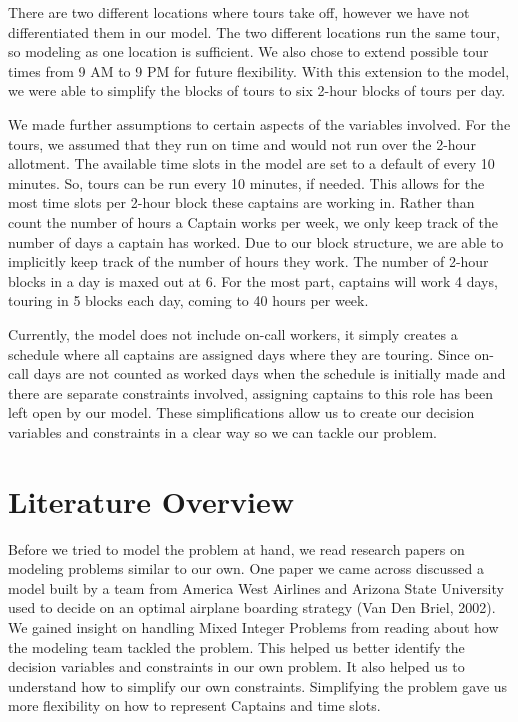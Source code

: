 \documentclass[12pt]{article}
\begin{document}
There are two different locations where tours take off, however we have not differentiated them in our model. The two different locations run the same tour, so modeling as one location is sufficient. We also chose to extend possible tour times from 9 AM to 9 PM for future flexibility. With this extension to the model, we were able to simplify the blocks of tours to six 2-hour blocks of tours per day. 

We made further assumptions to certain aspects of the variables involved. For the tours, we assumed that they run on time and would not run over the 2-hour allotment. The available time slots in the model are set to a default of every 10 minutes. So, tours can be run every 10 minutes, if needed. This allows for the most time slots per 2-hour block these captains are working in.  
Rather than count the number of hours a Captain works per week, we only keep track of the number of days a captain has worked. Due to our block structure, we are able to implicitly keep track of the number of hours they work. The number of 2-hour blocks in a day is maxed out at 6. For the most part, captains will work 4 days, touring in 5 blocks each day, coming to 40 hours per week.

Currently, the model does not include on-call workers, it simply creates a schedule where all captains are assigned days where they are touring. Since on-call days are not counted as worked days when the schedule is initially made and there are separate constraints involved, assigning captains to this role has been left open by our model. These simplifications allow us to create our decision variables and constraints in a clear way so we can tackle our problem.

\section*{Literature Overview}
Before we tried to model the problem at hand, we read research papers on modeling problems similar to our own. One paper we came across discussed a model built by a team from America West Airlines and Arizona State University used to decide on an optimal airplane boarding strategy (Van Den Briel, 2002). We gained insight on handling Mixed Integer Problems from reading about how the modeling team tackled the problem. This helped us better identify the decision variables and constraints in our own problem. It also helped us to understand how to simplify our own constraints. Simplifying the problem gave us more flexibility on how to represent Captains and time slots.
\end{document}
